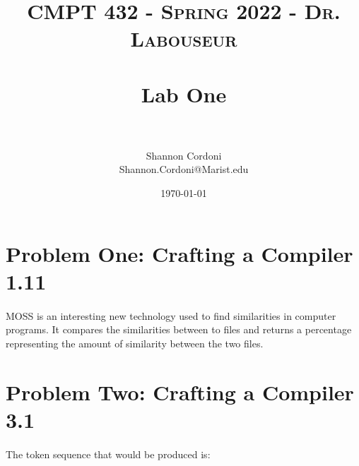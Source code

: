 \documentclass[letterpaper, 10pt,DIV=13]{scrartcl}
\title{	
   \normalfont \normalsize 
   \textsc{CMPT 432 - Spring 2022 - Dr. Labouseur} \\[10pt] %
   \horrule{0.5pt} \\[0.25cm] 	%
   \huge Lab One  \\     	    %
   \horrule{0.5pt} \\[0.25cm] 	%
}
\author{Shannon Cordoni \\ \normalsize Shannon.Cordoni@Marist.edu}
\date{\normalsize\today} 	%
\numberwithin{equation}{section} %
\numberwithin{figure}{section} %
\numberwithin{table}{section} %
\begin{document}
\maketitle %

\section{Problem One: Crafting a Compiler 1.11}

\paragraph{} MOSS is an interesting new technology used to find similarities in computer programs. It compares the similarities between to files and returns a percentage representing the amount of similarity between the two files.


\section{Problem Two: Crafting a Compiler 3.1}

\paragraph{} The token sequence that would be produced is:
\end{document}
